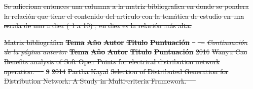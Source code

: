 \documentclass[12pt, letterpaper]{report}
\providecommand{\DIFdeltex}[1]{{\protect\color{red}\sout{#1}}}                      %
\providecommand{\DIFdel}[1]{\texorpdfstring{\DIFdeltex{#1}}{}} %
\begin{document}
\DIFdel{Se adicciona entonces una columna a la matriz bibliografica en donde se pondera la relación que tiene el contenido del articulo con la temática de estudio en una escala de uno a diez ( 1 a 10) , en diez es la relación más alta.}%

{%
\DIFdel{Matriz bibliográfica}}
\textbf{\DIFdel{Tema}} %
\textbf{\DIFdel{Año}} %
\textbf{\DIFdel{Autor}} %
\textbf{\DIFdel{Titulo}} %
\textbf{\DIFdel{Puntuación}} %
\DIFdel{\ }%
\DIFdel{\ -- }\textit{\DIFdel{Continuación de la página anterior}}%
\textbf{\DIFdel{Tema}} %
\textbf{\DIFdel{Año}} %
\textbf{\DIFdel{Autor}} %
\textbf{\DIFdel{Titulo}} %
\textbf{\DIFdel{Puntuación}}%
\DIFdel{2016 }%
\DIFdel{Wanyu Cao }%
\DIFdel{Benefits analysis of Soft Open Points for electrical distribution network	 operation. \mbox{%
\cite{Cao2016} }%
}%
\DIFdel{9 }%
\DIFdel{2014 }%
\DIFdel{Partha Kayal	 }%
\DIFdel{Selection of Distributed Generation for Distribution Network: A Study in Multi-criteria Framework. \mbox{%
\cite{Kayal2014} }%
}%
\end{document}
